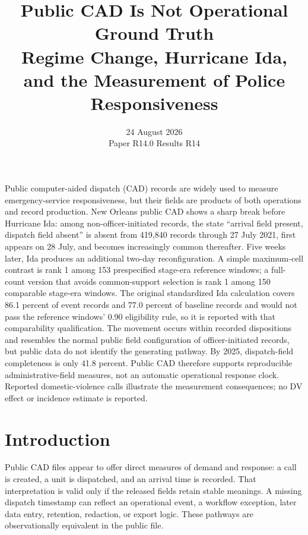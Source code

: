 \documentclass[11pt]{article}
\title{\vspace{-1.7em}\textbf{Public CAD Is Not Operational Ground Truth}\\[0.35em]
\large Regime Change, Hurricane Ida, and the Measurement of Police Responsiveness}
\author{}
\date{24 August 2026\\[0.2em]\small Paper R14.0 \quad Results R14}
\begin{document}
\maketitle
\thispagestyle{plain}
\vspace{-1.3em}

\begin{plainbox}[title=Abstract]
Public computer-aided dispatch (CAD) records are widely used to measure emergency-service responsiveness, but their fields are products of both operations and record production. New Orleans public CAD shows a sharp break before Hurricane Ida: among non-officer-initiated records, the state ``arrival field present, dispatch field absent'' is absent from 419,840 records through 27 July 2021, first appears on 28 July, and becomes increasingly common thereafter. Five weeks later, Ida produces an additional two-day reconfiguration. A simple maximum-cell contrast is rank 1 among 153 prespecified stage-era reference windows; a full-count version that avoids common-support selection is rank 1 among 150 comparable stage-era windows. The original standardized Ida calculation covers 86.1 percent of event records and 77.0 percent of baseline records and would not pass the reference windows' 0.90 eligibility rule, so it is reported with that comparability qualification. The movement occurs within recorded dispositions and resembles the normal public field configuration of officer-initiated records, but public data do not identify the generating pathway. By 2025, dispatch-field completeness is only 41.8 percent. Public CAD therefore supports reproducible administrative-field measures, not an automatic operational response clock. Reported domestic-violence calls illustrate the measurement consequences; no DV effect or incidence estimate is reported.
\end{plainbox}


\section{Introduction}

Public CAD files appear to offer direct measures of demand and response: a call is created, a unit is dispatched, and an arrival time is recorded. That interpretation is valid only if the released fields retain stable meanings. A missing dispatch timestamp can reflect an operational event, a workflow exception, later data entry, retention, redaction, or export logic. These pathways are observationally equivalent in the public file.
\end{document}
